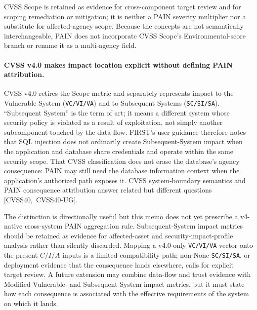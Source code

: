 \documentclass[11pt]{article}
\newcommand{\code}[1]{\texttt{#1}}
\begin{document}
CVSS Scope is retained as evidence for cross-component target review and for
scoping remediation or mitigation; it is neither a PAIN severity multiplier nor a
substitute for affected-agency scope. Because the concepts are not semantically
interchangeable, PAIN does not incorporate CVSS Scope's Environmental-score branch
or rename it as a multi-agency field.

\paragraph{CVSS v4.0 makes impact location explicit without defining PAIN
attribution.}
CVSS v4.0 retires the Scope metric and separately represents impact to the
Vulnerable System (\code{VC/VI/VA}) and to Subsequent Systems
(\code{SC/SI/SA}). ``Subsequent System'' is the term of art; it means a different
system whose security policy is violated as a result of exploitation, not simply
another subcomponent touched by the data flow. FIRST's user guidance therefore
notes that SQL injection does not ordinarily create Subsequent-System impact when
the application and database share credentials and operate within the same
security scope. That CVSS classification does not erase the database's agency
consequence: PAIN may still need the database information context when the
application's authorized path exposes it. CVSS system-boundary semantics and PAIN
consequence attribution answer related but different questions
\mbox{[CVSS40, CVSS40-UG]}.

The distinction is directionally useful but this memo does not yet prescribe a
v4-native cross-system PAIN aggregation rule. Subsequent-System impact metrics
should be retained as evidence for affected-asset and security-impact-profile
analysis rather than silently discarded. Mapping a v4.0-only
\code{VC/VI/VA} vector onto the present $C/I/A$ inputs is a limited compatibility
path; non-None \code{SC/SI/SA}, or deployment evidence that the consequence lands
elsewhere, calls for explicit target review. A future extension may combine
data-flow and trust evidence with Modified Vulnerable- and Subsequent-System
impact metrics, but it must state how each consequence is associated with the
effective requirements of the system on which it lands.
\end{document}
